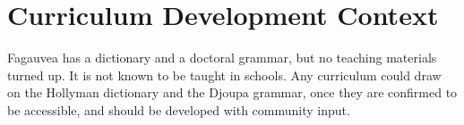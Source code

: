 \documentclass[12pt]{article}
\begin{document}
\section{Curriculum Development Context}
Fagauvea has a dictionary and a doctoral grammar, but no teaching materials turned up. It is not known to be taught in schools. Any curriculum could draw on the Hollyman dictionary and the Djoupa grammar, once they are confirmed to be accessible, and should be developed with community input.
\end{document}

